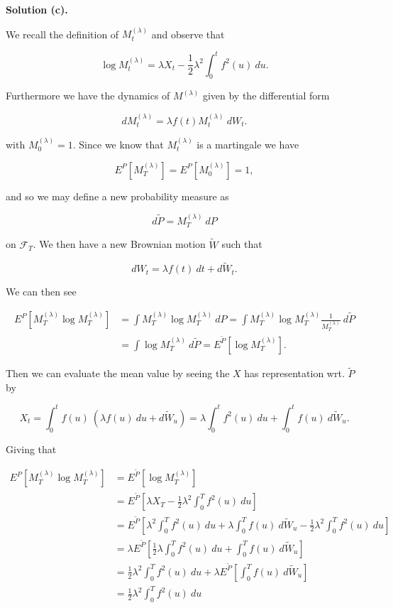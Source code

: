 \documentclass[
]{book}
\begin{document}
\textbf{Solution (c).}

We recall the definition of \(M_t^{(\lambda)}\) and observe that

\[
\log M_t^{(\lambda)}=\lambda X_t-\frac{1}{2}\lambda ^2\int_0^t f^2(u)\ du.
\]

Furthermore we have the dynamics of \(M^{(\lambda)}\) given by the differential form

\[
dM_t^{(\lambda)}=\lambda f(t)M_t^{(\lambda)}\ dW_t.
\]

with \(M_0^{(\lambda)}=1\). Since we know that \(M_t^{(\lambda)}\) is a martingale we have

\[
E^P[M_T^{(\lambda)}]=E^P[M_0^{(\lambda)}]=1,
\]

and so we may define a new probability measure as

\[
d\tilde{P}=M_T^{(\lambda)}\ dP
\]

on \(\mathcal{F}_T\). We then have a new Brownian motion \(\tilde{W}\) such that

\[
dW_t=\lambda f(t)\ dt + d\tilde{W}_t.
\]

We can then see

\begin{align*}
E^P[M_T^{(\lambda)}\log M_T^{(\lambda)}]&=\int M_T^{(\lambda)}\log M_T^{(\lambda)}\ dP=\int M_T^{(\lambda)}\log M_T^{(\lambda)} \frac{1}{M_T^{(\lambda)}}\ d\tilde{P}\\
&=\int \log M_T^{(\lambda)}\ d\tilde{P}=E^{\tilde{P}}[\log M_T^{(\lambda)}].
\end{align*}

Then we can evaluate the mean value by seeing the \(X\) has representation wrt. \(\tilde{P}\) by

\[
X_t=\int_0^tf(u)\ (\lambda f(u)\ du + d\tilde{W}_u)=\lambda\int_0^tf^2(u)\ du+\int_0^tf(u)\ d\tilde{W}_u.
\]

Giving that

\begin{align*}
E^P[M_T^{(\lambda)}\log M_T^{(\lambda)}]&=E^{\tilde{P}}[\log M_T^{(\lambda)}]\\
&=E^{\tilde{P}}\left[ \lambda X_T-\frac{1}{2}\lambda ^2\int_0^T f^2(u)\ du \right]\\
&=E^{\tilde{P}}\left[ \lambda^2\int_0^Tf^2(u)\ du+\lambda\int_0^Tf(u)\ d\tilde{W}_u-\frac{1}{2}\lambda ^2\int_0^T f^2(u)\ du \right]\\
&=\lambda E^{\tilde{P}}\left[\frac{1}{2} \lambda\int_0^Tf^2(u)\ du+\int_0^Tf(u)\ d\tilde{W}_u \right]\\
&=\frac{1}{2} \lambda^2\int_0^Tf^2(u)\ du+\lambda E^{\tilde{P}}\left[\int_0^Tf(u)\ d\tilde{W}_u \right]\\
&=\frac{1}{2} \lambda^2\int_0^Tf^2(u)\ du
\end{align*}
\end{document}
